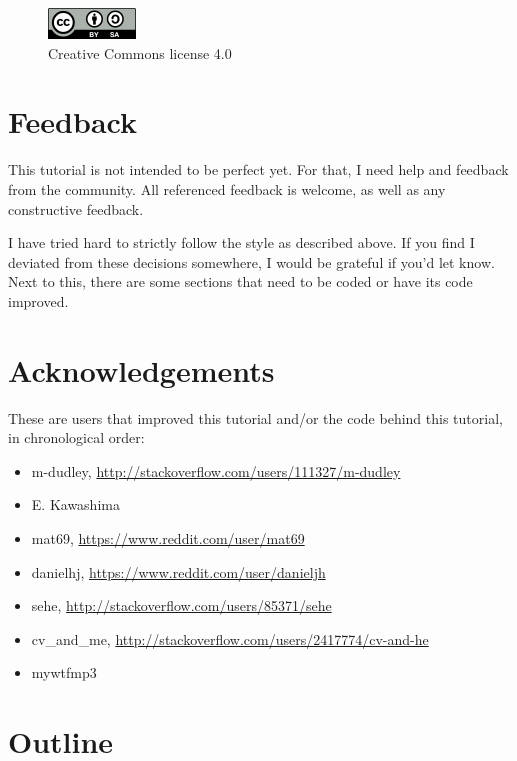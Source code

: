 \begin{figure}[!htbp]
  \includegraphics[]{CC-BY-SA_icon.png}
  \caption{
    Creative Commons license 4.0
  }
  \label{fig:license}
\end{figure}

\section{Feedback}

This tutorial is not intended to be perfect yet.
For that, I need help and feedback from the community.
All referenced feedback is welcome, as well as any constructive feedback.

I have tried hard to strictly follow the style as described above.
If you find I deviated from these decisions somewhere, I would be grateful
if you'd let know.
Next to this, there are some sections that need to be coded or have its
code improved.

\section{Acknowledgements}

These are users that improved this tutorial and/or the code behind this
tutorial, in chronological order:

\begin{itemize}
  \item m-dudley, \url{http://stackoverflow.com/users/111327/m-dudley}
  \item E. Kawashima
  \item mat69, \url{https://www.reddit.com/user/mat69}
  \item danielhj, \url{https://www.reddit.com/user/danieljh}
  \item sehe, \url{http://stackoverflow.com/users/85371/sehe}
  \item cv\_and\_me, \url{http://stackoverflow.com/users/2417774/cv-and-he}
  \item mywtfmp3
\end{itemize}

\section{Outline}

